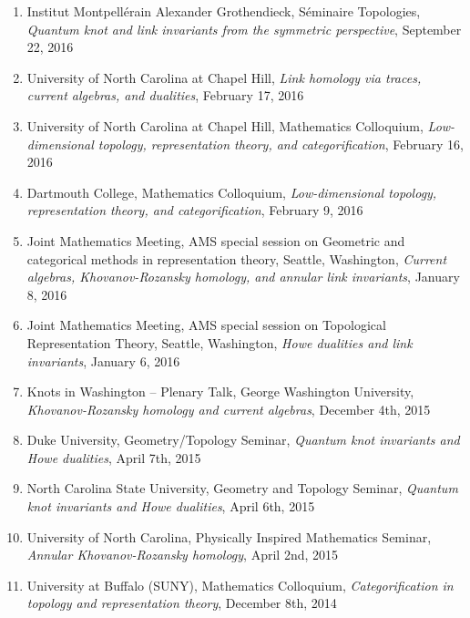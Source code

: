\documentclass[10pt]{article}
\begin{document}
\begin{enumerate}
\item Institut Montpell\'{e}rain Alexander Grothendieck, S\'{e}minaire Topologies, 
\emph{Quantum knot and link invariants from the symmetric perspective},
September 22, 2016

\item University of North Carolina at Chapel Hill, 
\emph{Link homology via traces, current algebras, and dualities},
February 17, 2016

\item University of North Carolina at Chapel Hill, 
Mathematics Colloquium,
\emph{Low-dimensional topology, representation theory, and categorification},
February 16, 2016

\item Dartmouth College, Mathematics Colloquium,
\emph{Low-dimensional topology, representation theory, and categorification},
February 9, 2016

\item Joint Mathematics Meeting, AMS special session on 
Geometric and categorical methods in representation theory, 
Seattle, Washington,
\emph{Current algebras, Khovanov-Rozansky homology, and annular link invariants},
January 8, 2016

\item Joint Mathematics Meeting, AMS special session on Topological Representation Theory, 
Seattle, Washington,
\emph{Howe dualities and link invariants},
January 6, 2016

\item Knots in Washington -- Plenary Talk, George Washington University,
\emph{Khovanov-Rozansky homology and current algebras},
December 4th, 2015

\item Duke University, Geometry/Topology Seminar, 
\emph{Quantum knot invariants and Howe dualities},
April 7th, 2015

\item North Carolina State University, Geometry and Topology Seminar, 
\emph{Quantum knot invariants and Howe dualities},
April 6th, 2015

\item University of North Carolina, Physically Inspired Mathematics Seminar, 
\emph{Annular Khovanov-Rozansky homology},
April 2nd, 2015

\item University at Buffalo (SUNY), Mathematics Colloquium, 
\emph{Categorification in topology and representation theory},
December 8th, 2014


\end{enumerate}
\end{document}
